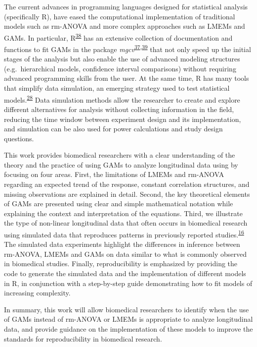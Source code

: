 \documentclass[
]{article}
\begin{document}
The current advances in programming languages designed for statistical analysis (specifically R), have eased the computational implementation of traditional models such as rm-ANOVA and more complex approaches such as LMEMs and GAMs. In particular, R\textsuperscript{\protect\hyperlink{ref-r}{38}} has an extensive collection of documentation and functions to fit GAMs in the package \emph{mgcv}\textsuperscript{\protect\hyperlink{ref-wood2017}{37},\protect\hyperlink{ref-wood2016}{39}} that not only speed up the initial stages of the analysis but also enable the use of advanced modeling structures (e.g.~hierarchical models, confidence interval comparisons) without requiring advanced programming skills from the user. At the same time, R has many tools that simplify data simulation, an emerging strategy used to test statistical models.\textsuperscript{\protect\hyperlink{ref-haverkamp2017}{28}} Data simulation methods allow the researcher to create and explore different alternatives for analysis without collecting information in the field, reducing the time window between experiment design and its implementation, and simulation can be also used for power calculations and study design questions.

This work provides biomedical researchers with a clear understanding of the theory and the practice of using GAMs to analyze longitudinal data using by focusing on four areas. First, the limitations of LMEMs and rm-ANOVA regarding an expected trend of the response, constant correlation structures, and missing observations are explained in detail. Second, the key theoretical elements of GAMs are presented using clear and simple mathematical notation while explaining the context and interpretation of the equations. Third, we illustrate the type of non-linear longitudinal data that often occurs in biomedical research using simulated data that reproduces patterns in previously reported studies.\textsuperscript{\protect\hyperlink{ref-vishwanath2009}{16}} The simulated data experiments highlight the differences in inference between rm-ANOVA, LMEMs and GAMs on data similar to what is commonly observed in biomedical studies. Finally, reproducibility is emphasized by providing the code to generate the simulated data and the implementation of different models in R, in conjunction with a step-by-step guide demonstrating how to fit models of increasing complexity.

In summary, this work will allow biomedical researchers to identify when the use of GAMs instead of rm-ANOVA or LMEMs is appropriate to analyze longitudinal data, and provide guidance on the implementation of these models to improve the standards for reproducibility in biomedical research.
\end{document}
